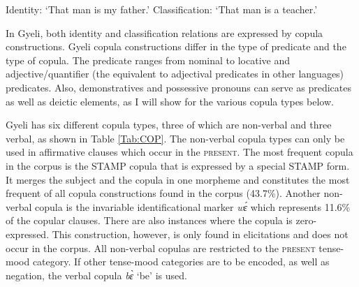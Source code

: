 \begin{exe}
\ex\label{man} 
\begin{xlist}
\ex Identity: `That man is my father.'
\ex Classification: `That man is a teacher.'
\end{xlist}
\end{exe}

In Gyeli, both identity and classification relations are expressed by copula constructions. Gyeli copula constructions differ in the type of predicate and the type of copula. The predicate ranges from nominal to locative and adjective/quantifier (the equivalent to adjectival predicates in other languages) predicates. Also, demonstratives and possessive pronouns can serve as predicates as well as deictic elements, as I will show for the various copula types below.

Gyeli has six different copula types, three of which are non-verbal and three verbal, as shown in Table \ref{Tab:COP}. The non-verbal copula types can only be used in affirmative clauses which occur in the \textsc{present}. The most frequent copula in the corpus is the STAMP copula that is expressed by a special STAMP form. It merges the subject and the copula in one morpheme and constitutes the most frequent of all copula constructions found in the corpus (43.7\%). Another non-verbal copula is the invariable identificational marker {\itshape wɛ́} which represents 11.6\% of the copular clauses. There are also instances where the copula is zero-expressed. This construction, however, is only found in elicitations and does not occur in the corpus. All non-verbal copulas are restricted to the \textsc{present} tense-mood category. If other tense-mood categories are to be encoded, as well as negation, the verbal copula {\itshape bɛ̀} `be' is used.

